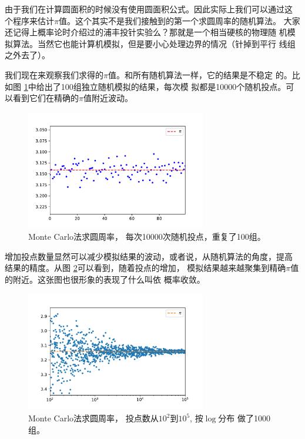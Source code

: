 
由于我们在计算圆面积的时候没有使用圆面积公式。因此实际上我们可以通过这
个程序来估计$\pi$值。这个其实不是我们接触到的第一个求圆周率的随机算法。
大家还记得上概率论时介绍过的浦丰投针实验么？那就是一个相当硬核的物理随
机模拟算法。当然它也能计算机模拟，但是要小心处理边界的情况（针掉到平行
  线组之外去了）。

我们现在来观察我们求得的$\pi$值。和所有随机算法一样，它的结果是不稳定
的。比如图 \ref{fig::variation}中给出了100组独立随机模拟的结果，每次模
拟都是10000个随机投点。可以看到它们在精确的$\pi$值附近波动。

\begin{figure}[!ht]
\centering
\includegraphics[width=0.7\textwidth]{images/variation.pdf}
\caption{Monte Carlo法求圆周率， 每次10000次随机投点，重复了100组。}
\label{fig::variation}
\end{figure}

增加投点数量显然可以减少模拟结果的波动，或者说，从随机算法的角度，提高
结果的精度。从图 \ref{fig::number2variation}可以看到，随着投点的增加，
模拟结果越来越聚集到精确$\pi$值的附近。这张图也很形象的表现了什么叫依
概率收敛。

\begin{figure}[!ht]
\centering
\includegraphics[width=0.7\textwidth]{images/number2variation.pdf}
\caption{Monte Carlo法求圆周率， 投点数从$10^2$到$10^5$, 按$\log$分布
  做了1000组。}
\label{fig::number2variation}
\end{figure}

